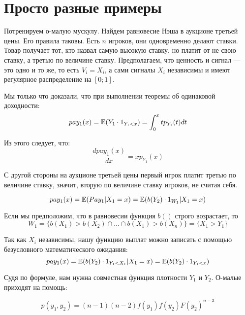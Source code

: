\section{Просто разные примеры}


\begin{myex} Потренируем о-малую мускулу. Найдем равновесие Нэша в аукционе третьей цены. Его правила таковы. Есть $ n $ игроков, они одновременно делают ставки. Товар получает тот, кто назвал самую высокую ставку, но платит от не свою ставку, а третью по величине ставку. Предполагаем, что ценность и сигнал — это одно и то же, то есть $ V_{i}=X_{i} $, а сами сигналы $ X_{i} $ независимы и имеют регулярное распределение на $ [0;1] $.


Мы только что доказали, что при выполнении теоремы об одинаковой доходности:
\begin{equation}
pay_{1}(x)=\operatorname{\mathbb{E}}(Y_{1}\cdot 1_{Y_{1}<x})=\int_{0}^{x}tp_{Y_{1}}(t)dt
\end{equation}

Из этого следует, что:
\begin{equation}
\frac{dpay_{1}(x)}{dx}=xp_{Y_{1}}(x)
\end{equation}


С другой стороны на аукционе третьей цены первый игрок платит третью по величине ставку, значит, вторую по величине ставку игроков, не считая себя.

\begin{equation}
pay_{1}(x)=\operatorname{\mathbb{E}}(Pay_{1}|X_{1}=x)=\operatorname{\mathbb{E}}(b(Y_{2})\cdot 1_{W_{1}}|X_{1}=x)
\end{equation}

Если мы предположим, что в равновесии функция $ b() $ строго возрастает, то
\begin{equation}
W_{1}=\{b(X_{1})>b(X_{2})\cap \ldots\cap  b(X_{1})>b(X_{n})\}=\{X_{1}>Y_{1}\}
\end{equation}

Так как $ X_{i} $ независимы, нашу функцию выплат можно записать с помощью безусловного математического ожидания:
\begin{equation}
pay_{1}(x)=\operatorname{\mathbb{E}}(b(Y_{2})\cdot 1_{Y_{1}<X_{1}}|X_{1}=x)=\operatorname{\mathbb{E}}(b(Y_{2})\cdot 1_{Y_{1}<x})
\end{equation}

Судя по формуле, нам нужна совместная функция плотности $ Y_{1} $ и $ Y_{2} $. О-малые приходят на помощь:

\begin{equation}
p(y_{1},y_{2})=(n-1)(n-2)f(y_{1})f(y_{2})F(y_{2})^{n-3}
\end{equation}


\end{myex}
